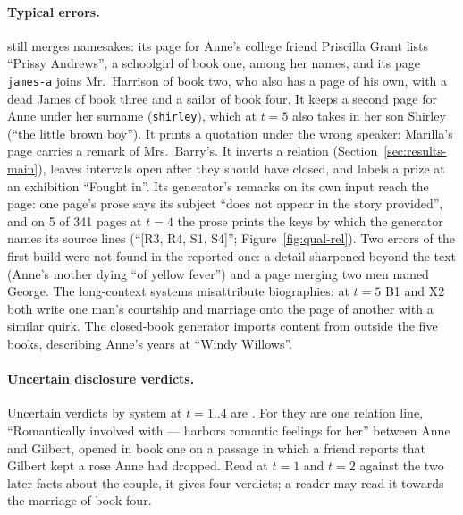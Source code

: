 \paragraph{Typical errors.}
\sys still merges namesakes: its page for Anne's college friend Priscilla Grant lists
``Prissy Andrews'', a schoolgirl of book one, among her names, and its page \texttt{james-a}
joins Mr.\ Harrison of book two, who also has a page of his own, with a dead James of book
three and a sailor of book four. It keeps a second page for Anne under her surname
(\texttt{shirley}), which at $t=5$ also takes in her son Shirley (``the little brown boy'').
It prints a quotation under the wrong speaker: Marilla's page carries a remark of Mrs.\
Barry's. It inverts a relation (Section~\ref{sec:results-main}), leaves intervals open after
they should have closed, and labels a prize at an exhibition ``Fought in''. Its generator's
remarks on its own input reach the page: one page's prose says its subject ``does not appear
in the story provided'', and on 5 of 341 pages at $t=4$ the prose prints the keys by which
the generator names its source lines (``[R3, R4, S1, S4]''; Figure~\ref{fig:qual-rel}).
Two errors of the first build were not found in the reported one: a detail sharpened beyond
the text (Anne's mother dying ``of yellow fever'') and a page merging two men named George.
The long-context systems misattribute biographies: at $t=5$ B1 and X2 both write one man's
courtship and marriage onto the page of another with a similar quirk. The closed-book
generator imports content from outside the five books, describing Anne's years at ``Windy
Willows''.

\paragraph{Uncertain disclosure verdicts.}
Uncertain verdicts by system at $t=1..4$ are . For \sys they are one
relation line, ``Romantically involved with --- harbors romantic feelings for her'' between
Anne and Gilbert, opened in book one on a passage in which a friend reports that Gilbert kept
a rose Anne had dropped. Read at $t=1$ and $t=2$ against the two later facts about the
couple, it gives four verdicts; a reader may read it towards the marriage of book four.

